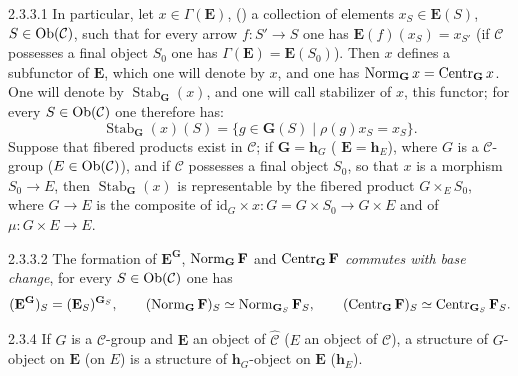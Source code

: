 \begin{scholium}{2.3.3.1}\label{I.2.3.3.1}
In particular, let \(x\in\Gamma(\mathbf{E})\), \ie () a collection of
elements \(x_{S}\in\mathbf{E}(S)\), \(S\in\operatorname{Ob}(\mathcal{C})\), such that for
every arrow \(f\colon S'\to S\) one has
\(\mathbf{E}(f)(x_{S})=x_{S'}\) (if \(\mathcal{C}\) possesses a final object
\(S_{0}\) one has \(\Gamma(\mathbf{E})=\mathbf{E}(S_{0})\)). Then \(x\)
defines a subfunctor of \(\mathbf{E}\), which one will denote by \(x\), and
one has \(\operatorname{Norm}_{\mathbf{G}}x=\operatorname{Centr}_{\mathbf{G}}x\). One will denote by
\(\operatorname{Stab}_{\mathbf{G}}(x)\), and one will call stabilizer of
\(x\), this functor; for every \(S\in\operatorname{Ob}(\mathcal{C})\) one therefore has:
\[
\operatorname{Stab}_{\mathbf{G}}(x)(S)
=\{g\in\mathbf{G}(S)\mid \rho(g)x_{S}=x_{S}\}.
\]
Suppose that fibered products exist in \(\mathcal{C}\); if
\(\mathbf{G}=\mathbf{h}_{G}\) (\resp
\(\mathbf{E}=\mathbf{h}_{E}\)), where \(G\) is a
\(\mathcal{C}\)-group (\resp \(E\in\operatorname{Ob}(\mathcal{C})\)), and if
\(\mathcal{C}\) possesses a final object \(S_{0}\), so that \(x\) is a
morphism \(S_{0}\to E\), then
\(\operatorname{Stab}_{\mathbf{G}}(x)\) is representable by the fibered
product \(G\times_{E}S_{0}\), where
\(G\to E\) is the composite of
\(\mathrm{id}_{G}\times x\colon
G=G\times S_{0}\to G\times E\) and of
\(\mu\colon G\times E\to E\).
\end{scholium}

\begin{remark}{2.3.3.2}\label{I.2.3.3.2}
\footnotemark[24]
The formation of \(\mathbf{E}^{\mathbf{G}}\), \(\operatorname{Norm}_{\mathbf{G}}\mathbf{F}\)
and \(\operatorname{Centr}_{\mathbf{G}}\mathbf{F}\) \emph{commutes with base change}, \ie
for every \(S\in\operatorname{Ob}(\mathcal{C})\) one has
\[
(\mathbf{E}^{\mathbf{G}})_{S}=(\mathbf{E}_{S})^{\mathbf{G}_{S}},
\qquad
(\operatorname{Norm}_{\mathbf{G}}\mathbf{F})_{S}\simeq\operatorname{Norm}_{\mathbf{G}_{S}}\mathbf{F}_{S},
\qquad
(\operatorname{Centr}_{\mathbf{G}}\mathbf{F})_{S}\simeq\operatorname{Centr}_{\mathbf{G}_{S}}\mathbf{F}_{S}.
\]
\end{remark}

\begin{definition}{2.3.4}\label{I.2.3.4}
If \(G\) is a \(\mathcal{C}\)-group and \(\mathbf{E}\) an object of
\(\widehat{\mathcal{C}}\) (\resp \(E\) an object of
\(\mathcal{C}\)), a structure of \(G\)-object on \(\mathbf{E}\)
(\resp on \(E\)) is a structure of
\(\mathbf{h}_{G}\)-object on \(\mathbf{E}\)
(\resp \(\mathbf{h}_{E}\)).
\end{definition}


